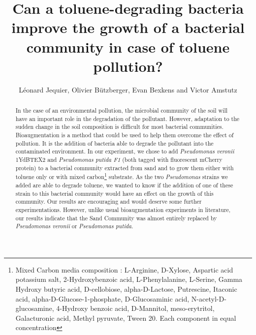 \documentclass[a4paper, 10pt, conference]{ieeeconf}   %
\title{\LARGE \bf
Can a toluene-degrading bacteria improve the growth of a bacterial community in case of toluene pollution?
}
\author{Léonard Jequier, Olivier Bützberger, Evan Bexkens and Victor Amstutz%
}
\begin{document}
\vspace{-2cm}
\maketitle
\thispagestyle{plain}
\pagestyle{plain}



\begin{abstract}

In the case of an environmental pollution, the microbial community of the soil will have an important role in the degradation of the pollutant. However, adaptation to the sudden change in the soil composition is difficult for most bacterial communities. Bioaugmentation is a method that could be used to help them overcome the effect of pollution. It is the addition of bacteria able to degrade the pollutant into the contaminated environment. In our experiment, we chose to add \textit{Pseudomonas veronii} 1YdBTEX2 and \textit{Pseudomonas putida F1} (both tagged with fluorescent mCherry protein) to a bacterial community extracted from sand and to grow them either with toluene only or with mixed carbon\footnote{Mixed Carbon media composition : L-Arginine, D-Xylose, Aspartic acid potassium salt, 2-Hydroxybenzoic acid, L-Phenylalanine, L-Serine, Gamma Hydroxy butyric acid, D-cellobiose, alpha-D-Lactose, Putrescine, Itaconic acid, alpha-D-Glucose-1-phosphate, D-Glucosaminic acid, N-acetyl-D-glucosamine, 4-Hydroxy benzoic acid, D-Mannitol, meso-erytritol, Galacturonic acid, Methyl pyruvate, Tween 20. Each component in equal concentration} substrate. As the two \textit{Pseudomonas} strains we added are able to degrade toluene, we wanted to know if the addition of one of these strain to this bacterial community would have an effect on the growth of this community.
Our results are encouraging and would deserve some further experimentations. However, unlike usual bioaugmentation experiments in literature, our results indicate that the Sand Community was almost entirely replaced by \textit{Pseudomonas veronii} or \textit{Pseudomonas putida}.


\end{abstract}
\end{document}

